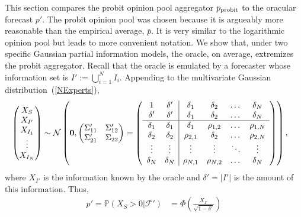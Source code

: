 \documentclass[11pt]{article}
\renewcommand{\P}{\mathbb{P}}
\theoremstyle{definition}
\theoremstyle{definition}
\def\P{{\mathbb P}}
\def\probit{p_{\rm probit}}
\begin{document}
This section compares the probit opinion pool aggregator $\probit$ 
to the oracular forecast $p'$. The probit opinion pool was chosen because it is argueably more reasonable than the empirical average, $\bar{p}$. It is very similar to the logarithmic opinion pool but leads to more convenient notation. We show that, under two specific Gaussian partial 
information models, the oracle, on average,
extremizes the probit aggregator.  Recall that the oracle is emulated
by a forecaster whose information set is $I' := \bigcup_{i=1}^N I_i$.
Appending to the multivariate Gaussian distribution~(\ref{NExperts}),
\begin{align}
\left(\begin{matrix} X_S \\ X_{I'} \\ X_{I_1}\\ \vdots \\ X_{I_N} 
 \end{matrix}\right) &\sim \mathcal{N}\left( 
 \boldsymbol{0}, \left(\begin{matrix} 
\Sigma_{11}' & \Sigma_{12}'\\
\Sigma_{21}' & \Sigma_{22}\\
 \end{matrix}\right) 
 =
 \left(\begin{array}{c c| c c cc }
1 & \delta' & \delta_1 & \delta_2 & \dots & \delta_N  \\ 
\delta' & \delta' & \delta_1 & \delta_2 & \dots & \delta_N  \\ \hline
\delta_1& \delta_1 & \delta_1 &\rho_{1,2} & \dots & \rho_{1,N}   \\ 
\delta_2 & \delta_2 &\rho_{2,1} & \delta_2 & \dots & \rho_{2,N}  \\ 
\vdots &\vdots & \vdots & \vdots & \ddots & \vdots  \\ 
\delta_N &\delta_N & \rho_{N,1} & \rho_{N,2} & \dots & \delta_N\\ 
 \end{array}\right)\right), \label{oracleN} 
\end{align}
where  $X_{I'}$  is the information known by the oracle and $\delta' = |I'|$ is the amount of this information.  Thus,
 \begin{align*}
p' = \P(X_S > 0 |  \mathcal{F}') 
   &= \Phi\left( \frac{X_{I'}}{\sqrt{1-\delta'}} \right)
\end{align*}
\end{document}
